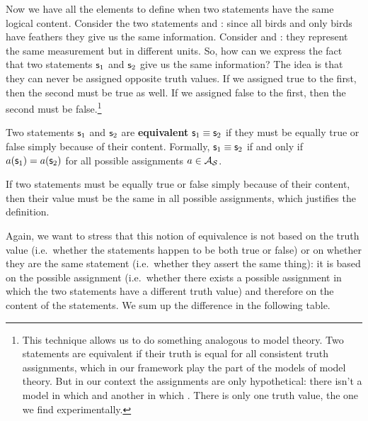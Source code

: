 \documentclass[11pt,letterpaper,fleqn]{memoir} %
\begin{document}
Now we have all the elements to define when two statements have the same logical content. Consider the two statements  and : since all birds and only birds have feathers they give us the same information. Consider  and : they represent the same measurement but in different units. So, how can we express the fact that two statements $\mathsf{s}_1$ and $\mathsf{s}_2$ give us the same information? The idea is that they can never be assigned opposite truth values. If we assigned true to the first, then the second must be true as well. If we assigned false to the first, then the second must be false.\footnote{This technique allows us to do something analogous to model theory. Two statements are equivalent if their truth is equal for all consistent truth assignments, which in our framework play the part of the models of model theory. But in our context the assignments are only hypothetical: there isn't a model in which  and another in which . There is only one truth value, the one we find experimentally.}

\begin{mathSection}

\begin{defn}
	Two statements $\mathsf{s}_1$ and $\mathsf{s}_2$ are \textbf{equivalent} $\mathsf{s}_1 \equiv \mathsf{s}_2$ if they must be equally true or false simply because of their content. Formally, $\mathsf{s}_1 \equiv \mathsf{s}_2$ if and only if $a(\mathsf{s}_1)=a(\mathsf{s}_2)$ for all possible assignments $a \in \mathcal{A}_{\mathcal{S}}$.
\end{defn}

\begin{justification}
	If two statements must be equally true or false simply because of their content, then their value must be the same in all possible assignments, which justifies the definition.
\end{justification}

\end{mathSection}

Again, we want to stress that this notion of equivalence is not based on the truth value (i.e.~whether the statements happen to be both true or false) or on whether they are the same statement (i.e.~whether they assert the same thing): it is based on the possible assignment (i.e.~whether there exists a possible assignment in which the two statements have a different truth value) and therefore on the content of the statements. We sum up the difference in the following table.
\end{document}
